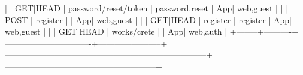 |        | GET|HEAD | password/reset/{token}        | password.reset        | App\Http\Controllers\Auth\ResetPasswordController@showResetForm        | web,guest                                            |
|        | POST     | register                      |                       | App\Http\Controllers\Auth\RegisterController@register                  | web,guest                                            |
|        | GET|HEAD | register                      | register              | App\Http\Controllers\Auth\RegisterController@showRegistrationForm      | web,guest                                            |
|        | GET|HEAD | works/crete                   |                       | App\Http\Controllers\WorkController@index                              | web,auth                                             |
+--------+----------+-------------------------------+-----------------------+------------------------------------------------------------------------+------------------------------------------------------+
